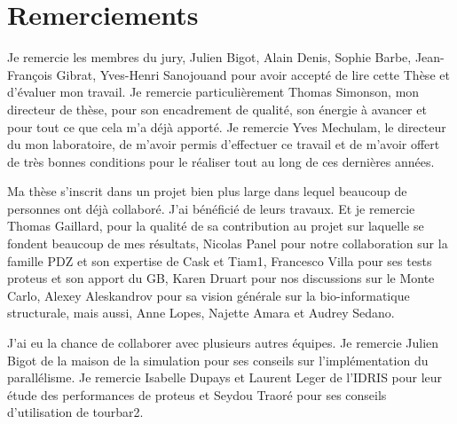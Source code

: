 \chapter*{Remerciements}

Je remercie les membres du jury, Julien Bigot, Alain Denis, Sophie Barbe, Jean-François Gibrat, Yves-Henri Sanojouand pour avoir accepté de lire cette Thèse et d'évaluer mon travail. Je remercie particulièrement Thomas Simonson, mon directeur de thèse, pour son encadrement de qualité, son énergie à avancer et pour tout ce que cela m'a déjà apporté. Je remercie Yves Mechulam, le directeur du mon laboratoire, de m'avoir permis d'effectuer ce travail et de m'avoir offert de très bonnes conditions pour le réaliser tout au long de ces dernières années.

Ma thèse s'inscrit dans un projet bien plus large dans lequel beaucoup de personnes ont déjà collaboré. J'ai bénéficié de leurs travaux. Et je remercie Thomas Gaillard, pour la qualité de sa contribution au projet sur laquelle se fondent beaucoup de mes résultats, Nicolas Panel pour notre collaboration sur la famille PDZ et son expertise de Cask et Tiam1, Francesco Villa pour ses tests proteus et son apport du GB, Karen Druart pour nos discussions sur le Monte Carlo, Alexey Aleskandrov pour sa vision générale sur la bio-informatique structurale, mais aussi, Anne Lopes, Najette Amara et Audrey Sedano.

J'ai eu la chance de collaborer avec plusieurs autres équipes. Je remercie Julien Bigot de la maison de la simulation pour ses conseils sur l'implémentation du parallélisme. Je remercie Isabelle Dupays et Laurent Leger de l'IDRIS pour leur étude des performances de proteus et Seydou Traoré pour ses conseils d'utilisation de tourbar2. 


